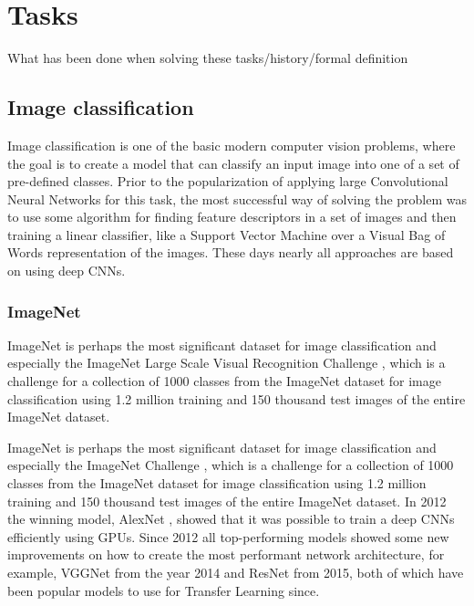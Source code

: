 \chapter{Tasks}
What has been done when solving these tasks/history/formal definition
\section{Image classification}
Image classification is one of the basic modern computer vision problems, where the goal is to create a model that can classify an input image into one of a set of pre-defined classes. Prior to the popularization of applying large Convolutional Neural Networks for this task, the most successful way of solving the problem was to use some algorithm for finding feature descriptors in a set of images and then training a linear classifier, like a Support Vector Machine over a Visual Bag of Words representation of the images. These days nearly all approaches are based on using deep CNNs.
\subsection{ImageNet}
ImageNet  \citep{imagenet}  is perhaps the most significant dataset for image classification and especially the ImageNet Large Scale Visual Recognition Challenge \citep{ILSVRC}, which is a challenge for a collection of 1000 classes from the ImageNet dataset for image classification using 1.2 million training and 150 thousand test images of the entire ImageNet dataset.

ImageNet  \citep{imagenet}  is perhaps the most significant dataset for image classification and especially the ImageNet Challenge \citep{ILSVRC}, which is a challenge for a collection of 1000 classes from the ImageNet dataset for image classification using 1.2 million training and 150 thousand test images of the entire ImageNet dataset. In 2012 the winning model, AlexNet \citep{alexNet}, showed that it was possible to train a deep CNNs efficiently using GPUs. Since 2012 all top-performing models showed some new improvements on how to create the most performant network architecture, for example, VGGNet from the year 2014 and ResNet \citep{resNet} from 2015, both of which have been popular models to use for Transfer Learning since.

